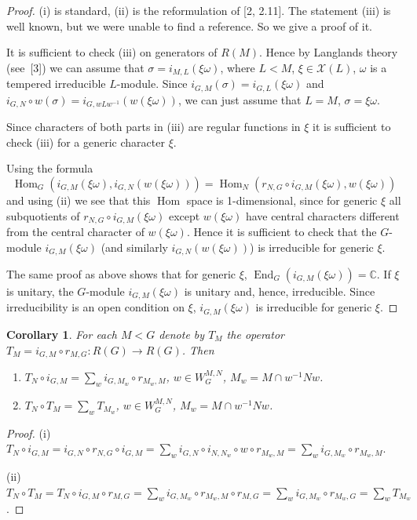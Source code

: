 \documentclass[12pt,a4paper]{article}
\theoremstyle{plain}
\newtheorem{corollary}{Corollary}
\theoremstyle{definition}
\theoremstyle{remark}
\DeclareMathOperator{\End}{End}
\DeclareMathOperator{\Hom}{Hom}
\newcommand{\cX}{\mathcal{X}}
\newcommand{\bC}{\mathbb{C}}
\begin{document}
\begin{proof}
(i) is standard, (ii) is the reformulation of [2, 2.11]. The statement (iii) is well known, but we were unable to find a reference. So we give a proof of it.

It is sufficient to check (iii) on generators of $R(M)$. Hence by Langlands theory (see~[3]) we can assume that $\sigma = i_{M,L}(\xi\omega)$, where $L < M$, $\xi \in \cX(L)$, $\omega$ is a tempered irreducible $L$-module. Since $i_{G,M}(\sigma) = i_{G,L}(\xi\omega)$ and $i_{G,N} \circ w(\sigma) = i_{G,wLw^{-1}}(w(\xi\omega))$, we can just assume that $L = M$, $\sigma = \xi\omega$.

Since characters of both parts in (iii) are regular functions in $\xi$ it is sufficient to check (iii) for a generic character $\xi$.

Using the formula
\[
\Hom_G(i_{G,M}(\xi\omega), i_{G,N}(w(\xi\omega))) = \Hom_N(r_{N,G} \circ i_{G,M}(\xi\omega), w(\xi\omega))
\]
and using (ii) we see that this $\Hom$ space is 1-dimensional, since for generic $\xi$ all subquotients of $r_{N,G} \circ i_{G,M}(\xi\omega)$ except $w(\xi\omega)$ have central characters different from the central character of $w(\xi\omega)$. Hence it is sufficient to check that the $G$-module $i_{G,M}(\xi\omega)$ (and similarly $i_{G,N}(w(\xi\omega))$) is irreducible for generic $\xi$.

The same proof as above shows that for generic $\xi$, $\End_G(i_{G,M}(\xi\omega)) = \bC$. If $\xi$ is unitary, the $G$-module $i_{G,M}(\xi\omega)$ is unitary and, hence, irreducible. Since irreducibility is an open condition on $\xi$, $i_{G,M}(\xi\omega)$ is irreducible for generic $\xi$.
\end{proof}

\begin{corollary}
For each $M < G$ denote by $T_M$ the operator $T_M = i_{G,M} \circ r_{M,G}: R(G) \to R(G)$. Then
\begin{enumerate}[label=(\roman*)]
\item $T_N \circ i_{G,M} = \sum_w i_{G,M_w} \circ r_{M_w,M}$, $w \in W_{G}^{M,N}$, $M_w = M \cap w^{-1}Nw$.
\item $T_N \circ T_M = \sum_w T_{M_w}$, $w \in W_{G}^{M,N}$, $M_w = M \cap w^{-1}Nw$.
\end{enumerate}
\end{corollary}

\begin{proof}
(i) $T_N \circ i_{G,M} = i_{G,N} \circ r_{N,G} \circ i_{G,M} = \sum_w i_{G,N} \circ i_{N,N_w} \circ w \circ r_{M_w,M} = \sum_w i_{G,M_w} \circ r_{M_w,M}$.

(ii) $T_N \circ T_M = T_N \circ i_{G,M} \circ r_{M,G} = \sum_w i_{G,M_w} \circ r_{M_w,M} \circ r_{M,G} = \sum_w i_{G,M_w} \circ r_{M_w,G} = \sum_w T_{M_w}$.
\end{proof}
\end{document}
